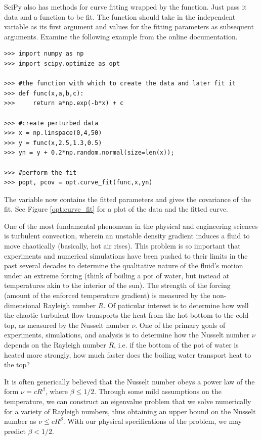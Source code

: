 SciPy also has methods for curve fitting wrapped by the  function.
Just pass it data and a function to be fit. 
The function should take in the independent variable as its first argument and values for the fitting parameters as subsequent arguments.
Examine the following example from the online documentation.
\begin{lstlisting}
>>> import numpy as np
>>> import scipy.optimize as opt

>>> #the function with which to create the data and later fit it
>>> def func(x,a,b,c):
>>>     return a*np.exp(-b*x) + c

>>> #create perturbed data
>>> x = np.linspace(0,4,50)
>>> y = func(x,2.5,1.3,0.5)
>>> yn = y + 0.2*np.random.normal(size=len(x));

>>> #perform the fit
>>> popt, pcov = opt.curve_fit(func,x,yn)
\end{lstlisting}
The variable  now contains the fitted parameters and  gives the covariance of the fit.
See Figure \ref{opt:curve_fit} for a plot of the data and the fitted curve.

One of the most fundamental phenomena in the physical and engineering sciences is turbulent convection, wherein an unstable density gradient induces a fluid to move chaotically (basically, hot air rises).  
This problem is so important that experiments and numerical simulations have been pushed to their limits in the past several decades to determine the qualitative nature of the fluid's motion under an extreme forcing (think of boiling a pot of water, but instead at temperatures akin to the interior of the sun).  
The strength of the forcing (amount of the enforced temperature gradient) is measured by the non-dimensional Rayleigh number $R$.  
Of paticular interest is to determine how well the chaotic turbulent flow transports the heat from the hot bottom to the cold top, as measured by the Nusselt number $\nu$.  
One of the primary goals of experiments, simulations, and analysis is to determine how the Nusselt number $\nu$ depends on the Rayleigh number $R$, i.e. if the bottom of the pot of water is heated more strongly, how much faster does the boiling water transport heat to the top?

It is often generically believed that the Nusselt number obeys a power law of the form $\nu = cR^\beta$, where $\beta \le 1/2$.  
Through some mild assumptions on the temperature, we can construct an eigenvalue problem that we solve numerically for a variety of Rayleigh numbers, thus obtaining an upper bound on the Nusselt number as $\nu \le cR^\beta$.  With our physical specifications of the problem, we may predict $\beta < 1/2$.

